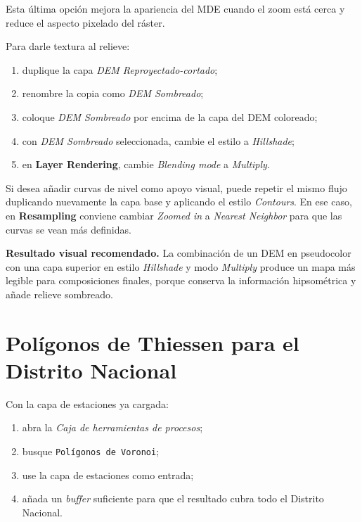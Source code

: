 \documentclass[11pt]{article}
\begin{document}
Esta última opción mejora la apariencia del MDE cuando el zoom está cerca y
reduce el aspecto pixelado del ráster.


Para darle textura al relieve:
\begin{enumerate}
  \item duplique la capa \emph{DEM Reproyectado-cortado};
  \item renombre la copia como \emph{DEM Sombreado};
  \item coloque \emph{DEM Sombreado} por encima de la capa del DEM coloreado;
  \item con \emph{DEM Sombreado} seleccionada, cambie el estilo a
        \emph{Hillshade};
  \item en \textbf{Layer Rendering}, cambie \emph{Blending mode} a
        \emph{Multiply}.
\end{enumerate}

Si desea añadir curvas de nivel como apoyo visual, puede repetir el mismo flujo
duplicando nuevamente la capa base y aplicando el estilo \emph{Contours}. En ese
caso, en \textbf{Resampling} conviene cambiar \emph{Zoomed in} a
\emph{Nearest Neighbor} para que las curvas se vean más definidas.

\begin{tealbox}
\textbf{Resultado visual recomendado.}
La combinación de un DEM en pseudocolor con una capa superior en estilo
\emph{Hillshade} y modo \emph{Multiply} produce un mapa más legible para
composiciones finales, porque conserva la información hipsométrica y añade
relieve sombreado.
\end{tealbox}

\section{Polígonos de Thiessen para el Distrito Nacional}


Con la capa de estaciones ya cargada:
\begin{enumerate}
  \item abra la \emph{Caja de herramientas de procesos};
  \item busque \texttt{Polígonos de Voronoi};
  \item use la capa de estaciones como entrada;
  \item añada un \emph{buffer} suficiente para que el resultado cubra todo el
        Distrito Nacional.
\end{enumerate}
\end{document}
